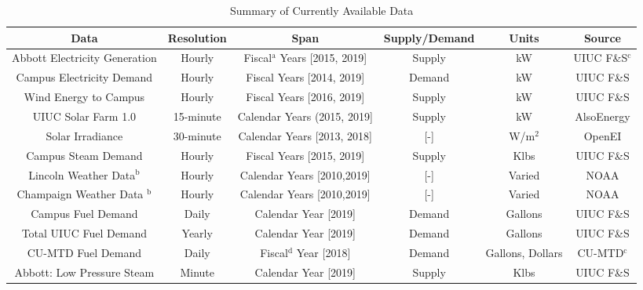 \begin{landscape}

  \begin{table}
    \centering
    \caption{Summary of Currently Available Data}
    \label{tab:datasummary}
    \begin{tabular}{c|c|c|c|c|c}
      \hline
      Data & Resolution & Span & Supply/Demand & Units & Source\\
      \hline
      Abbott Electricity Generation & Hourly & Fiscal$^{\text{a}}$ Years [2015, 2019]& Supply & kW & UIUC F\&S$^{\text{c}}$\\
      Campus Electricity Demand & Hourly & Fiscal Years [2014, 2019] & Demand & kW & UIUC F\&S \\
      Wind Energy to Campus & Hourly & Fiscal Years [2016, 2019] & Supply & kW & UIUC F\&S \\
      UIUC Solar Farm 1.0 & 15-minute & Calendar Years (2015, 2019] & Supply & kW & AlsoEnergy \cite{alsoenergy_university_2019}\\
      Solar Irradiance & 30-minute & Calendar Years [2013, 2018]& [-] & W/m$^2$& OpenEI \cite{sengupta_national_2018}\\
      Campus Steam Demand & Hourly & Fiscal Years [2015, 2019] & Supply & Klbs & UIUC F\&S\\
      Lincoln Weather Data$^{\text{b}}$ & Hourly & Calendar Years [2010,2019] & [-] & Varied & NOAA \cite{noauthor_climate_nodate} \\
      Champaign Weather Data $^{\text{b}}$& Hourly & Calendar Years [2010,2019]& [-] & Varied & NOAA \cite{noauthor_climate_nodate}\\
      Campus Fuel Demand & Daily & Calendar Year [2019]& Demand & Gallons & UIUC F\&S \\
      Total UIUC Fuel Demand & Yearly & Calendar Year [2019]& Demand & Gallons & UIUC F\&S \\
      CU-MTD Fuel Demand & Daily & Fiscal$^{\text{d}}$ Year [2018]& Demand & Gallons, Dollars & CU-MTD$^{\text{c}}$ \\
      Abbott: Low Pressure Steam & Minute & Calendar Year [2019] & Supply & Klbs & UIUC F\&S\\

\end{tabular}
\end{table}
\end{landscape}
